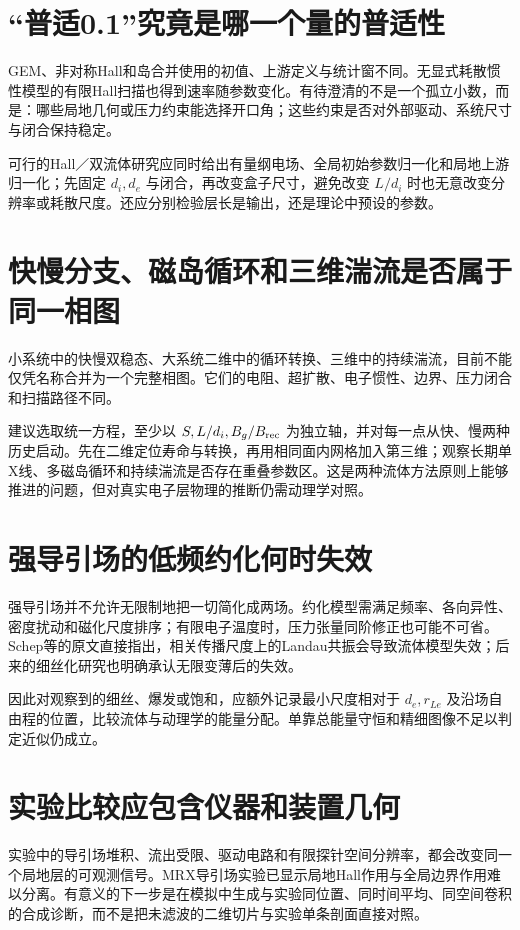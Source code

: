 \documentclass[UTF8,a4paper,11pt,openany,fontset=fandol]{ctexbook}
\begin{document}
\section{“普适0.1”究竟是哪一个量的普适性}
GEM、非对称Hall和岛合并使用的初值、上游定义与统计窗不同。无显式耗散惯性模型的有限Hall扫描也得到速率随参数变化。\citep{Birn2001,Cassak2008,Ng2015,Andres2016}有待澄清的不是一个孤立小数，而是：哪些局地几何或压力约束能选择开口角；这些约束是否对外部驱动、系统尺寸与闭合保持稳定。

可行的Hall／双流体研究应同时给出有量纲电场、全局初始参数归一化和局地上游归一化；先固定 $d_i,d_e$ 与闭合，再改变盒子尺寸，避免改变 $L/d_i$ 时也无意改变分辨率或耗散尺度。还应分别检验层长是输出，还是理论中预设的参数。

\section{快慢分支、磁岛循环和三维湍流是否属于同一相图}
小系统中的快慢双稳态、大系统二维中的循环转换、三维中的持续湍流，目前不能仅凭名称合并为一个完整相图。\citep{Cassak2005,Cassak2010,Huang2011,Huang2024}它们的电阻、超扩散、电子惯性、边界、压力闭合和扫描路径不同。

建议选取统一方程，至少以 $S,L/d_i,B_g/B_{\rm rec}$ 为独立轴，并对每一点从快、慢两种历史启动。先在二维定位寿命与转换，再用相同面内网格加入第三维；观察长期单X线、多磁岛循环和持续湍流是否存在重叠参数区。这是两种流体方法原则上能够推进的问题，但对真实电子层物理的推断仍需动理学对照。

\section{强导引场的低频约化何时失效}
强导引场并不允许无限制地把一切简化成两场。约化模型需满足频率、各向异性、密度扰动和磁化尺度排序；有限电子温度时，压力张量同阶修正也可能不可省。Schep等的原文直接指出，相关传播尺度上的Landau共振会导致流体模型失效；后来的细丝化研究也明确承认无限变薄后的失效。\citep{Schep1994,L049}

因此对观察到的细丝、爆发或饱和，应额外记录最小尺度相对于 $d_e,r_{Le}$ 及沿场自由程的位置，比较流体与动理学的能量分配。单靠总能量守恒和精细图像不足以判定近似仍成立。

\section{实验比较应包含仪器和装置几何}
实验中的导引场堆积、流出受限、驱动电路和有限探针空间分辨率，都会改变同一个局地层的可观测信号。MRX导引场实验已显示局地Hall作用与全局边界作用难以分离。\citep{GuideExp2012}有意义的下一步是在模拟中生成与实验同位置、同时间平均、同空间卷积的合成诊断，而不是把未滤波的二维切片与实验单条剖面直接对照。
\end{document}
